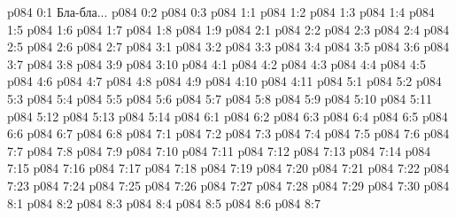 \author{Глава Серафимов}
\vs p084 0:1  Бла-бла...
\vs p084 0:2 
\vs p084 0:3 
\vs p084 1:1 
\vs p084 1:2 
\vs p084 1:3 \pc 
\vs p084 1:4 
\vs p084 1:5 
\vs p084 1:6 \pc 
\vs p084 1:7 
\vs p084 1:8 
\vs p084 1:9 
\vs p084 2:1 
\vs p084 2:2 
\vs p084 2:3 
\vs p084 2:4 
\vs p084 2:5 
\vs p084 2:6 
\vs p084 2:7 
\vs p084 3:1 
\vs p084 3:2 
\vs p084 3:3 
\vs p084 3:4 
\vs p084 3:5 
\vs p084 3:6 \pc 
\vs p084 3:7 
\vs p084 3:8 
\vs p084 3:9 
\vs p084 3:10 
\vs p084 4:1 
\vs p084 4:2 \pc 
\vs p084 4:3 
\vs p084 4:4 \pc 
\vs p084 4:5 
\vs p084 4:6 
\vs p084 4:7 
\vs p084 4:8 
\vs p084 4:9 
\vs p084 4:10 \pc 
\vs p084 4:11 
\vs p084 5:1 
\vs p084 5:2 
\vs p084 5:3 
\vs p084 5:4 
\vs p084 5:5 \pc 
\vs p084 5:6 
\vs p084 5:7 \pc 
\vs p084 5:8 
\vs p084 5:9 \pc 
\vs p084 5:10 
\vs p084 5:11 
\vs p084 5:12 
\vs p084 5:13 
\vs p084 5:14 
\vs p084 6:1 
\vs p084 6:2 
\vs p084 6:3 \pc 
\vs p084 6:4 
\vs p084 6:5 \pc 
\vs p084 6:6 
\vs p084 6:7 \pc 
\vs p084 6:8 
\vs p084 7:1 
\vs p084 7:2 
\vs p084 7:3 
\vs p084 7:4 
\vs p084 7:5 
\vs p084 7:6 
\vs p084 7:7 
\vs p084 7:8 \pc 
\vs p084 7:9 
\vs p084 7:10 \pc 
\vs p084 7:11 
\vs p084 7:12 
\vs p084 7:13 
\vs p084 7:14 
\vs p084 7:15 
\vs p084 7:16 
\vs p084 7:17 
\vs p084 7:18 
\vs p084 7:19 \pc 
\vs p084 7:20 
\vs p084 7:21 
\vs p084 7:22 
\vs p084 7:23 
\vs p084 7:24 
\vs p084 7:25 \pc 
\vs p084 7:26 
\vs p084 7:27 \pc 
\vs p084 7:28 \pc 
\vs p084 7:29 
\vs p084 7:30 
\vs p084 8:1 
\vs p084 8:2 
\vs p084 8:3 
\vs p084 8:4 
\vs p084 8:5 
\vs p084 8:6 \pc 
\vsetoff
\vs p084 8:7 
\quizlink
